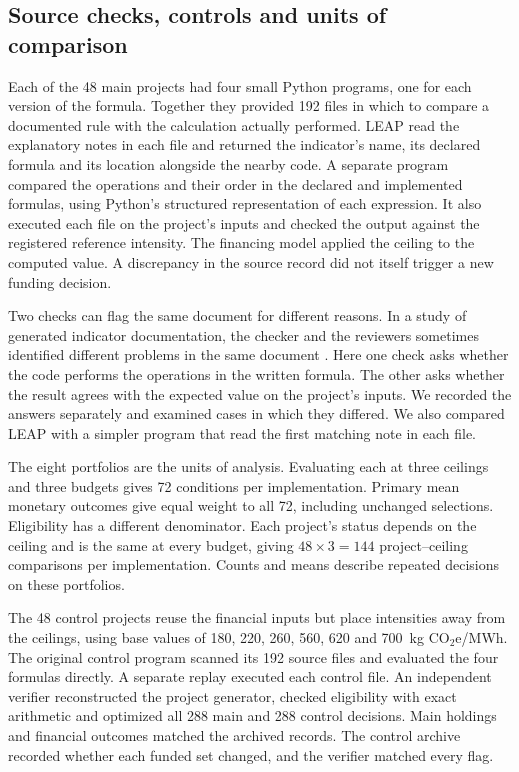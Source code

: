 \documentclass[ijfs,article,submit,oneauthor]{Definitions/mdpi}
\newcommand{\unit}{kg CO$_2$e/MWh}
\begin{document}
\subsection{Source checks, controls and units of comparison}
Each of the 48 main projects had four small Python programs, one for each version of the formula. Together they provided 192 files in which to compare a documented rule with the calculation actually performed. LEAP read the explanatory notes in each file and returned the indicator's name, its declared formula and its location alongside the nearby code. A separate program compared the operations and their order in the declared and implemented formulas, using Python's structured representation of each expression. It also executed each file on the project's inputs and checked the output against the registered reference intensity. The financing model applied the ceiling to the computed value. A discrepancy in the source record did not itself trigger a new funding decision.

Two checks can flag the same document for different reasons. In a study of generated indicator documentation, the checker and the reviewers sometimes identified different problems in the same document \citep{checks}. Here one check asks whether the code performs the operations in the written formula. The other asks whether the result agrees with the expected value on the project's inputs. We recorded the answers separately and examined cases in which they differed. We also compared LEAP with a simpler program that read the first matching note in each file.

The eight portfolios are the units of analysis. Evaluating each at three ceilings and three budgets gives 72 conditions per implementation. Primary mean monetary outcomes give equal weight to all 72, including unchanged selections. Eligibility has a different denominator. Each project's status depends on the ceiling and is the same at every budget, giving $48\times3=144$ project--ceiling comparisons per implementation. Counts and means describe repeated decisions on these portfolios.

The 48 control projects reuse the financial inputs but place intensities away from the ceilings, using base values of 180, 220, 260, 560, 620 and 700~\unit. The original control program scanned its 192 source files and evaluated the four formulas directly. A separate replay executed each control file. An independent verifier reconstructed the project generator, checked eligibility with exact arithmetic and optimized all 288 main and 288 control decisions. Main holdings and financial outcomes matched the archived records. The control archive recorded whether each funded set changed, and the verifier matched every flag.
\end{document}
